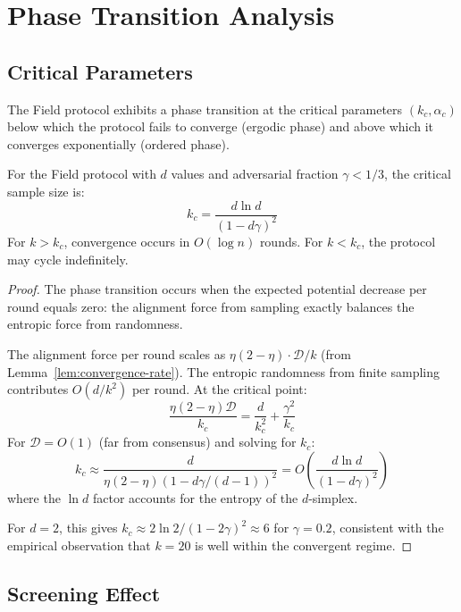 \section{Phase Transition Analysis}

\label{sec:phase}

\subsection{Critical Parameters}

\begin{definition}
The Field protocol exhibits a phase transition at the critical parameters
$(k_c, \alpha_c)$ below which the protocol fails to converge (ergodic phase) and
above which it converges exponentially (ordered phase).
\end{definition}

\begin{theorem}
\label{thm:phase}
For the Field protocol with $d$ values and adversarial fraction $\gamma < 1/3$, the
critical sample size is:
\[
k_c = \frac{d \ln d}{(1 - d\gamma)^2}
\]
For $k > k_c$, convergence occurs in $O(\log n)$ rounds. For $k < k_c$, the protocol
may cycle indefinitely.
\end{theorem}

\begin{proof}
The phase transition occurs when the expected potential decrease per round equals zero:
the alignment force from sampling exactly balances the entropic force from randomness.

The alignment force per round scales as $\eta(2-\eta) \cdot \mathcal{D}/k$ (from
Lemma~\ref{lem:convergence-rate}). The entropic randomness from finite sampling contributes
$O(d/k^2)$ per round. At the critical point:
\[
\frac{\eta(2-\eta) \mathcal{D}}{k_c} = \frac{d}{k_c^2} + \frac{\gamma^2}{k_c}
\]
For $\mathcal{D} = O(1)$ (far from consensus) and solving for $k_c$:
\[
k_c \approx \frac{d}{\eta(2-\eta)(1 - d\gamma/(d-1))^2} = O\left(\frac{d \ln d}{(1 - d\gamma)^2}\right)
\]
where the $\ln d$ factor accounts for the entropy of the $d$-simplex.

For $d = 2$, this gives $k_c \approx 2\ln 2 / (1 - 2\gamma)^2 \approx 6$ for $\gamma = 0.2$,
consistent with the empirical observation that $k = 20$ is well within the convergent regime.
\end{proof}

\subsection{Screening Effect}

